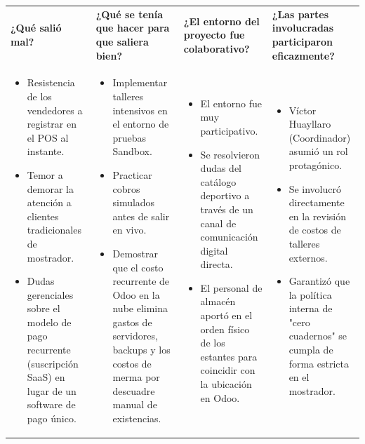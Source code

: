 \documentclass[11pt]{article}
\begin{document}
\begin{longtable}{|p{3.8cm}|p{3.8cm}|p{3.8cm}|p{3.8cm}|}
\hline
\rowcolor{RoundGray}\multicolumn{4}{|l|}{\textbf{Segunda Ronda}} \\ \hline
\rowcolor{HeaderGray}\textbf{¿Qué salió mal?} & \textbf{¿Qué se tenía que hacer para que saliera bien?} & \textbf{¿El entorno del proyecto fue colaborativo?} & \textbf{¿Las partes involucradas participaron eficazmente?} \\ \hline
\begin{itemize}[leftmargin=*,nosep]
    \item Resistencia de los vendedores a registrar en el POS al instante.
    \item Temor a demorar la atención a clientes tradicionales de mostrador.
    \item Dudas gerenciales sobre el modelo de pago recurrente (suscripción SaaS) en lugar de un software de pago único.
\end{itemize} &
\begin{itemize}[leftmargin=*,nosep]
    \item Implementar talleres intensivos en el entorno de pruebas Sandbox.
    \item Practicar cobros simulados antes de salir en vivo.
    \item Demostrar que el costo recurrente de Odoo en la nube elimina gastos de servidores, backups y los costos de merma por descuadre manual de existencias.
\end{itemize} &
\begin{itemize}[leftmargin=*,nosep]
    \item El entorno fue muy participativo.
    \item Se resolvieron dudas del catálogo deportivo a través de un canal de comunicación digital directa.
    \item El personal de almacén aportó en el orden físico de los estantes para coincidir con la ubicación en Odoo.
\end{itemize} &
\begin{itemize}[leftmargin=*,nosep]
    \item Víctor Huayllaro (Coordinador) asumió un rol protagónico.
    \item Se involucró directamente en la revisión de costos de talleres externos.
    \item Garantizó que la política interna de "cero cuadernos" se cumpla de forma estricta en el mostrador.
\end{itemize} \\ \hline


\end{longtable}
\end{document}
